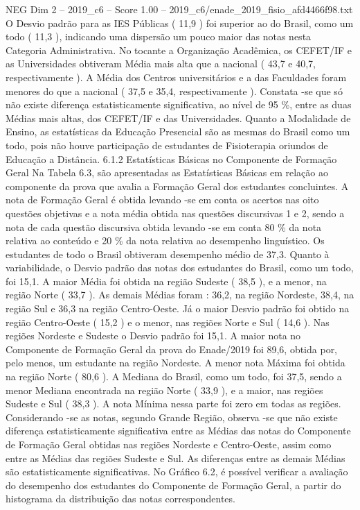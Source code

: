 \begin{textsample}{NEG Dim 2 – 2019\_c6 – Score 1.00 – 2019\_c6/enade\_2019\_fisio\_afd4466f98.txt}
O Desvio padrão para as IES Públicas ( 11,9 ) foi superior ao do Brasil, como um todo ( 11,3 ), indicando uma dispersão um pouco maior das notas nesta Categoria Administrativa.
No tocante a Organização Acadêmica, os CEFET/IF e as Universidades obtiveram Média mais alta que a nacional ( 43,7 e 40,7, respectivamente ).
A Média dos Centros universitários e a das Faculdades foram menores do que a nacional ( 37,5 e 35,4, respectivamente ).
Constata -se que só não existe diferença estatisticamente significativa, ao nível de 95 \%, entre as duas Médias mais altas, dos CEFET/IF e das Universidades.
Quanto a Modalidade de Ensino, as estatísticas da Educação Presencial são as mesmas do Brasil como um todo, pois não houve participação de estudantes de Fisioterapia oriundos de Educação a Distância. 6.1.2 Estatísticas Básicas no Componente de Formação Geral Na Tabela 6.3, são apresentadas as Estatísticas Básicas em relação ao componente da prova que avalia a Formação Geral dos estudantes concluintes.
A nota de Formação Geral é obtida levando -se em conta os acertos nas oito questões objetivas e a nota média obtida nas questões discursivas 1 e 2, sendo a nota de cada questão discursiva obtida levando -se em conta 80 \% da nota relativa ao conteúdo e 20 \% da nota relativa ao desempenho linguístico.
Os estudantes de todo o Brasil obtiveram desempenho médio de 37,3.
Quanto à variabilidade, o Desvio padrão das notas dos estudantes do Brasil, como um todo, foi 15,1.
A maior Média foi obtida na região Sudeste ( 38,5 ), e a menor, na região Norte ( 33,7 ).
As demais Médias foram : 36,2, na região Nordeste, 38,4, na região Sul e 36,3 na região Centro-Oeste.
Já o maior Desvio padrão foi obtido na região Centro-Oeste ( 15,2 ) e o menor, nas regiões Norte e Sul ( 14,6 ).
Nas regiões Nordeste e Sudeste o Desvio padrão foi 15,1.
A maior nota no Componente de Formação Geral da prova do Enade/2019 foi 89,6, obtida por, pelo menos, um estudante na região Nordeste.
A menor nota Máxima foi obtida na região Norte ( 80,6 ).
A Mediana do Brasil, como um todo, foi 37,5, sendo a menor Mediana encontrada na região Norte ( 33,9 ), e a maior, nas regiões Sudeste e Sul ( 38,3 ).
A nota Mínima nessa parte foi zero em todas as regiões.
Considerando -se as notas, segundo Grande Região, observa -se que não existe diferença estatisticamente significativa entre as Médias das notas do Componente de Formação Geral obtidas nas regiões Nordeste e Centro-Oeste, assim como entre as Médias das regiões Sudeste e Sul.
As diferenças entre as demais Médias são estatisticamente significativas.
No Gráfico 6.2, é possível verificar a avaliação do desempenho dos estudantes do Componente de Formação Geral, a partir do histograma da distribuição das notas correspondentes.

\end{textsample}
